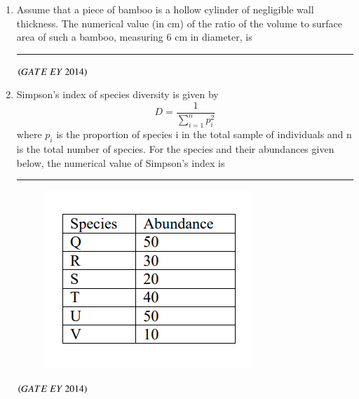 \documentclass[journal]{IEEEtran}
\numberwithin{equation}{enumi}
\numberwithin{figure}{enumi}
\begin{document}
\begin{enumerate}
    \item Assume that a piece of bamboo is a hollow cylinder of negligible wall thickness. The numerical value (in cm) of the ratio of the volume to surface area of such a bamboo, measuring 6 cm in diameter, is \rule{3cm}{0.15mm}
    \hfill{$\brak{ GATE\ EY\ 2014}$}
    \bigskip

    \item Simpson's index of species diversity is given by
    $$D = \frac{1}{\sum_{i=1}^{n} p_i^2}$$
    where $p_i$ is the proportion of species i in the total sample of individuals and n is the total number of species. For the species and their abundances given below, the numerical value of Simpson's index is \rule{3cm}{0.15mm}
    \begin{figure}[H]
    \centering
    \includegraphics[width=0.7\columnwidth]{figs/18.png}
    \caption{}
    \label{fig:18}
   \end{figure}
    \hfill{$\brak{ GATE\ EY\ 2014}$}
    \bigskip


\end{enumerate}
\end{document}
